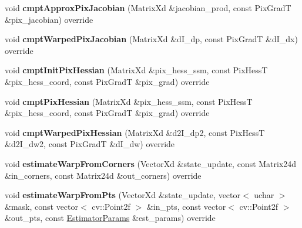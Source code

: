 \begin{DoxyCompactItemize}
\item 
\hypertarget{classIsometry_a06d6487780128675bd3f966aa066c006}{void {\bfseries cmpt\-Approx\-Pix\-Jacobian} (Matrix\-Xd \&jacobian\-\_\-prod, const Pix\-Grad\-T \&pix\-\_\-jacobian) override}\label{classIsometry_a06d6487780128675bd3f966aa066c006}

\item 
\hypertarget{classIsometry_af9ace1779a2ec28e7fd28334d6b4075b}{void {\bfseries cmpt\-Warped\-Pix\-Jacobian} (Matrix\-Xd \&d\-I\-\_\-dp, const Pix\-Grad\-T \&d\-I\-\_\-dx) override}\label{classIsometry_af9ace1779a2ec28e7fd28334d6b4075b}

\item 
\hypertarget{classIsometry_adad75ad785675f9acb69ad27c21fb1e4}{void {\bfseries cmpt\-Init\-Pix\-Hessian} (Matrix\-Xd \&pix\-\_\-hess\-\_\-ssm, const Pix\-Hess\-T \&pix\-\_\-hess\-\_\-coord, const Pix\-Grad\-T \&pix\-\_\-grad) override}\label{classIsometry_adad75ad785675f9acb69ad27c21fb1e4}

\item 
\hypertarget{classIsometry_ab026181c9910336c530fd048c53467e0}{void {\bfseries cmpt\-Pix\-Hessian} (Matrix\-Xd \&pix\-\_\-hess\-\_\-ssm, const Pix\-Hess\-T \&pix\-\_\-hess\-\_\-coord, const Pix\-Grad\-T \&pix\-\_\-grad) override}\label{classIsometry_ab026181c9910336c530fd048c53467e0}

\item 
\hypertarget{classIsometry_a254ac5f1d49d7de063541a48569a8ab5}{void {\bfseries cmpt\-Warped\-Pix\-Hessian} (Matrix\-Xd \&d2\-I\-\_\-dp2, const Pix\-Hess\-T \&d2\-I\-\_\-dw2, const Pix\-Grad\-T \&d\-I\-\_\-dw) override}\label{classIsometry_a254ac5f1d49d7de063541a48569a8ab5}

\item 
\hypertarget{classIsometry_a7660963c2ddab4a3c6d0cf2ac6ee20ce}{void {\bfseries estimate\-Warp\-From\-Corners} (Vector\-Xd \&state\-\_\-update, const Matrix24d \&in\-\_\-corners, const Matrix24d \&out\-\_\-corners) override}\label{classIsometry_a7660963c2ddab4a3c6d0cf2ac6ee20ce}

\item 
\hypertarget{classIsometry_a80b39c2850c75b782c9ab71a9251a56d}{void {\bfseries estimate\-Warp\-From\-Pts} (Vector\-Xd \&state\-\_\-update, vector$<$ uchar $>$ \&mask, const vector$<$ cv\-::\-Point2f $>$ \&in\-\_\-pts, const vector$<$ cv\-::\-Point2f $>$ \&out\-\_\-pts, const \hyperlink{structSSMEstimatorParams}{Estimator\-Params} \&est\-\_\-params) override}\label{classIsometry_a80b39c2850c75b782c9ab71a9251a56d}


\end{DoxyCompactItemize}
